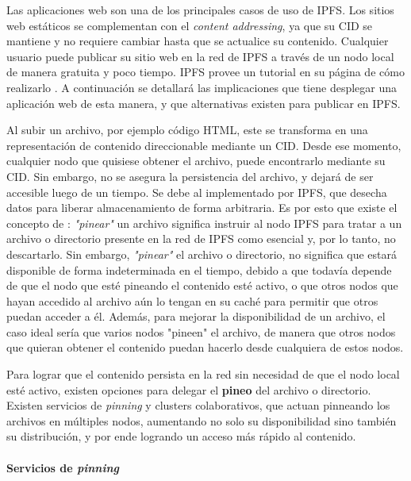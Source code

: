 Las aplicaciones web son una de los principales casos de uso de IPFS. Los sitios web estáticos se complementan con el \textit{content addressing}, ya que su CID se mantiene y no requiere cambiar hasta que se actualice su contenido. Cualquier usuario puede publicar su sitio web en la red de IPFS a través de un nodo local de manera gratuita y poco tiempo. IPFS provee un tutorial en su página de cómo realizarlo \cite{ipfs-static-website}. A continuación se detallará las implicaciones que tiene desplegar una aplicación web de esta manera, y que alternativas existen para publicar en IPFS.

Al subir un archivo, por ejemplo código HTML, este se transforma en una representación de contenido direccionable mediante un CID. Desde ese momento, cualquier nodo que quisiese obtener el archivo, puede encontrarlo mediante su CID. Sin embargo, no se asegura la persistencia del archivo, y dejará de ser accesible luego de un tiempo. Se debe al \cite{garbage-collector} implementado por IPFS, que desecha datos para liberar almacenamiento de forma arbitraria. Es por esto que existe el concepto de \cite{pinning}: \textit{"pinear"} un archivo significa instruir al nodo IPFS para tratar a un archivo o directorio presente en la red de IPFS como esencial y, por lo tanto, no descartarlo. Sin embargo, \textit{"pinear"} el archivo o directorio, no significa que estará disponible de forma indeterminada en el tiempo, debido a que todavía depende de que el nodo que esté pineando el contenido esté activo, o que otros nodos que hayan accedido al archivo aún lo tengan en su caché para permitir que otros puedan acceder a él. Además, para mejorar la disponibilidad de un archivo, el caso ideal sería que varios nodos "pineen" el archivo, de manera que otros nodos que quieran obtener el contenido puedan hacerlo desde cualquiera de estos nodos.

Para lograr que el contenido persista en la red sin necesidad de que el nodo local esté activo, existen opciones para delegar el \textbf{pineo} del archivo o directorio. Existen servicios de \textit{pinning} y clusters colaborativos, que actuan pinneando los archivos en múltiples nodos, aumentando no solo su disponibilidad sino también su distribución, y por ende logrando un acceso más rápido al contenido.

\paragraph{Servicios de \textit{pinning}}

